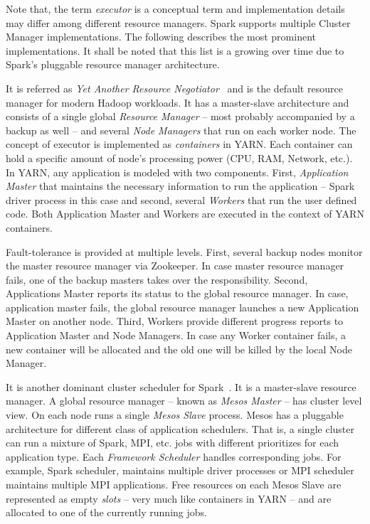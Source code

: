 Note that, the term \emph{executor} is a conceptual term and implementation details may differ among different resource managers. Spark supports multiple Cluster Manager implementations. The following describes the most prominent implementations. It shall be noted that this list is a growing over time due to Spark's pluggable resource manager architecture.
\begin{description}[leftmargin=0pt]
    \item [Apache YARN] It is referred as \emph{Yet Another Resource Negotiator}~\cite{Vavilapalli:2013} and is the default resource manager for modern Hadoop workloads. It has a master-slave architecture and consists of a single global \emph{Resource Manager} -- most probably accompanied by a backup as well --  and several \emph{Node Managers} that run on each worker node. The concept of executor is implemented as \emph{containers} in YARN. Each container can hold a specific amount of node's processing power (CPU, RAM, Network, etc.). In YARN, any application is modeled with two components. First, \emph{Application Master} that maintains the necessary information to run the application -- Spark driver process in this case and second, several \emph{Workers} that run the user defined code. Both Application Master and Workers are executed in the context of YARN containers. 
    
    Fault-tolerance is provided at multiple levels. First, several backup nodes monitor the master resource manager via Zookeeper. In case master resource manager fails, one of the backup masters takes over the responsibility. Second, Applications Master reports its status to the global resource manager. In case, application master fails, the global resource manager launches a new Application Master on another node. Third, Workers provide different progress reports to Application Master and Node Managers. In case any Worker container fails, a new container will be allocated and the old one will be killed by the local Node Manager.
    \item [Apache Mesos] It is another dominant cluster scheduler for Spark~\cite{Hindman:2011}. It is a master-slave resource manager. A global resource manager -- known as \emph{Mesos Master} -- has cluster level view. On each node runs a single \emph{Mesos Slave} process. Mesos has a pluggable architecture for different class of application schedulers. That is, a single cluster can run a mixture of Spark, MPI, etc. jobs with different prioritizes for each application type. Each \emph{Framework Scheduler} handles corresponding jobs. For example, Spark scheduler, maintains multiple driver processes or MPI scheduler maintains multiple MPI applications. Free resources on each Mesos Slave are represented as empty \emph{slots} -- very much like containers in YARN -- and are allocated to one of the currently running jobs.
    

\end{description}
